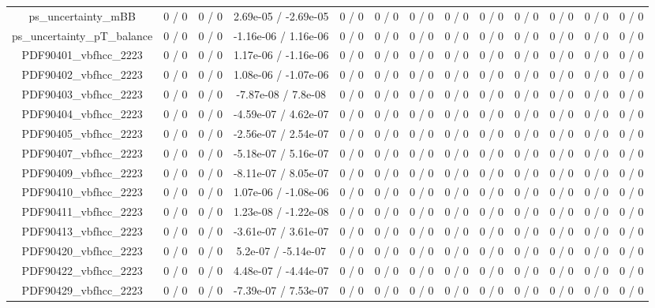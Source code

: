 \documentclass[10pt]{article}
\begin{document}
\begin{table}[htbp]
\begin{center}
\begin{tabular}{|c|c|c|c|c|c|c|c|c|c|c|c|c|}
  ps_uncertainty_mBB & 0 / 0 & 0 / 0 & 2.69e-05 / -2.69e-05 & 0 / 0 & 0 / 0 & 0 / 0 & 0 / 0 & 0 / 0 & 0 / 0 & 0 / 0 & 0 / 0 & 0 / 0 \\ 
  ps_uncertainty_pT_balance & 0 / 0 & 0 / 0 & -1.16e-06 / 1.16e-06 & 0 / 0 & 0 / 0 & 0 / 0 & 0 / 0 & 0 / 0 & 0 / 0 & 0 / 0 & 0 / 0 & 0 / 0 \\ 
  PDF90401_vbfhcc_2223 & 0 / 0 & 0 / 0 & 1.17e-06 / -1.16e-06 & 0 / 0 & 0 / 0 & 0 / 0 & 0 / 0 & 0 / 0 & 0 / 0 & 0 / 0 & 0 / 0 & 0 / 0 \\ 
  PDF90402_vbfhcc_2223 & 0 / 0 & 0 / 0 & 1.08e-06 / -1.07e-06 & 0 / 0 & 0 / 0 & 0 / 0 & 0 / 0 & 0 / 0 & 0 / 0 & 0 / 0 & 0 / 0 & 0 / 0 \\ 
  PDF90403_vbfhcc_2223 & 0 / 0 & 0 / 0 & -7.87e-08 / 7.8e-08 & 0 / 0 & 0 / 0 & 0 / 0 & 0 / 0 & 0 / 0 & 0 / 0 & 0 / 0 & 0 / 0 & 0 / 0 \\ 
  PDF90404_vbfhcc_2223 & 0 / 0 & 0 / 0 & -4.59e-07 / 4.62e-07 & 0 / 0 & 0 / 0 & 0 / 0 & 0 / 0 & 0 / 0 & 0 / 0 & 0 / 0 & 0 / 0 & 0 / 0 \\ 
  PDF90405_vbfhcc_2223 & 0 / 0 & 0 / 0 & -2.56e-07 / 2.54e-07 & 0 / 0 & 0 / 0 & 0 / 0 & 0 / 0 & 0 / 0 & 0 / 0 & 0 / 0 & 0 / 0 & 0 / 0 \\ 
  PDF90407_vbfhcc_2223 & 0 / 0 & 0 / 0 & -5.18e-07 / 5.16e-07 & 0 / 0 & 0 / 0 & 0 / 0 & 0 / 0 & 0 / 0 & 0 / 0 & 0 / 0 & 0 / 0 & 0 / 0 \\ 
  PDF90409_vbfhcc_2223 & 0 / 0 & 0 / 0 & -8.11e-07 / 8.05e-07 & 0 / 0 & 0 / 0 & 0 / 0 & 0 / 0 & 0 / 0 & 0 / 0 & 0 / 0 & 0 / 0 & 0 / 0 \\ 
  PDF90410_vbfhcc_2223 & 0 / 0 & 0 / 0 & 1.07e-06 / -1.08e-06 & 0 / 0 & 0 / 0 & 0 / 0 & 0 / 0 & 0 / 0 & 0 / 0 & 0 / 0 & 0 / 0 & 0 / 0 \\ 
  PDF90411_vbfhcc_2223 & 0 / 0 & 0 / 0 & 1.23e-08 / -1.22e-08 & 0 / 0 & 0 / 0 & 0 / 0 & 0 / 0 & 0 / 0 & 0 / 0 & 0 / 0 & 0 / 0 & 0 / 0 \\ 
  PDF90413_vbfhcc_2223 & 0 / 0 & 0 / 0 & -3.61e-07 / 3.61e-07 & 0 / 0 & 0 / 0 & 0 / 0 & 0 / 0 & 0 / 0 & 0 / 0 & 0 / 0 & 0 / 0 & 0 / 0 \\ 
  PDF90420_vbfhcc_2223 & 0 / 0 & 0 / 0 & 5.2e-07 / -5.14e-07 & 0 / 0 & 0 / 0 & 0 / 0 & 0 / 0 & 0 / 0 & 0 / 0 & 0 / 0 & 0 / 0 & 0 / 0 \\ 
  PDF90422_vbfhcc_2223 & 0 / 0 & 0 / 0 & 4.48e-07 / -4.44e-07 & 0 / 0 & 0 / 0 & 0 / 0 & 0 / 0 & 0 / 0 & 0 / 0 & 0 / 0 & 0 / 0 & 0 / 0 \\ 
  PDF90429_vbfhcc_2223 & 0 / 0 & 0 / 0 & -7.39e-07 / 7.53e-07 & 0 / 0 & 0 / 0 & 0 / 0 & 0 / 0 & 0 / 0 & 0 / 0 & 0 / 0 & 0 / 0 & 0 / 0 \\ 

\end{tabular}
\end{center}
\end{table}
\end{document}
